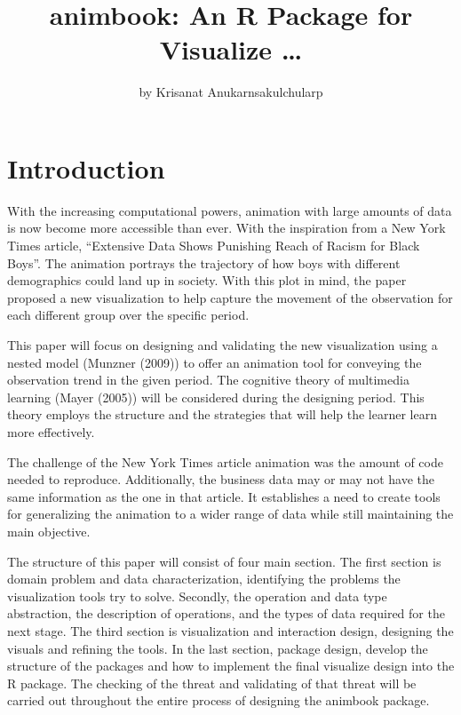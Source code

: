\title{animbook: An R Package for Visualize \ldots{}}
\author{by Krisanat Anukarnsakulchularp}

\maketitle


\hypertarget{introduction}{%
\section{Introduction}\label{introduction}}

With the increasing computational powers, animation with large amounts of data is now become more accessible than ever. With the inspiration from a New York Times article, ``Extensive Data Shows Punishing Reach of Racism for Black Boys''. The animation portrays the trajectory of how boys with different demographics could land up in society. With this plot in mind, the paper proposed a new visualization to help capture the movement of the observation for each different group over the specific period.

This paper will focus on designing and validating the new visualization using a nested model (Munzner (2009)) to offer an animation tool for conveying the observation trend in the given period. The cognitive theory of multimedia learning (Mayer (2005)) will be considered during the designing period. This theory employs the structure and the strategies that will help the learner learn more effectively.

The challenge of the New York Times article animation was the amount of code needed to reproduce. Additionally, the business data may or may not have the same information as the one in that article. It establishes a need to create tools for generalizing the animation to a wider range of data while still maintaining the main objective.

The structure of this paper will consist of four main section. The first section is domain problem and data characterization, identifying the problems the visualization tools try to solve. Secondly, the operation and data type abstraction, the description of operations, and the types of data required for the next stage. The third section is visualization and interaction design, designing the visuals and refining the tools. In the last section, package design, develop the structure of the packages and how to implement the final visualize design into the R package. The checking of the threat and validating of that threat will be carried out throughout the entire process of designing the animbook package.

